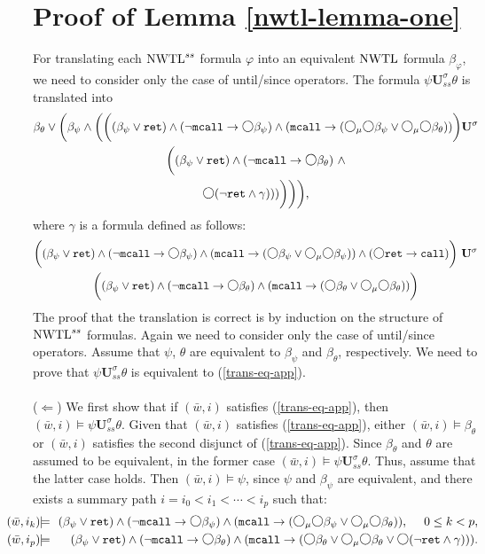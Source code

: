 \documentclass{LMCS}
\newcommand{\M}{{\mu}}
\newcommand{\w}{{\bar{w}}}
\newcommand{\dm}{\Diamond}
\newcommand{\U}{{\mathbf U}}
\newcommand{\next}{\text{\raisebox{1pt}{$\bigcirc$}}}
\renewcommand{\phi}{\varphi}
\theoremstyle{plain}
\theoremstyle{definition}
\newcommand{\ppath}{\sigma} \newcommand{\Ul}{\U}
\newcommand{\Up}{\U^\ppath}
\newcommand{\Uss}{\Up_{ss}}
\newcommand{\mcall}{{\tt{mcall}}}
\newcommand{\nwtlss}{\nwtl^{ss}}
\newcommand{\rett}{{\tt ret}}
\newcommand{\call}{{\tt call}}
\newcommand{\dmm}{\dm_{\M}}
\renewcommand{\dm}{\next}
\renewcommand{\dmm}{\dm_\M}
\begin{document}
\section{Proof of Lemma \ref{nwtl-lemma-one}}
\noindent
For translating each $\nwtlss$ formula $\phi$ into an equivalent
$\text{\rm NWTL}$ formula $\beta_\phi$, we need to consider only the case of
until/since operators. The formula $\psi \Uss \theta$ is translated
into
{\small
\begin{multline}
\label{trans-eq-app}
{\beta_\theta \vee \bigg(\beta_\psi \wedge \bigg(\bigg((\beta_\psi \vee
\rett) \wedge (\neg \mcall \to \dm \beta_\psi) \wedge (\mcall \to (\dmm
\dm \beta_\psi \vee \dmm \dm \beta_\theta))\bigg) \Up} \\ 
{\bigg((\beta_\psi \vee \rett) \wedge (\neg \mcall \to \dm \beta_\theta)
\ \wedge} \\ 
{\dm (\neg \rett \wedge \gamma)))\bigg)\bigg)\bigg),}
\end{multline}
}
where $\gamma$ is a formula defined as follows:
{\small
\begin{multline*}
{\bigg((\beta_\psi \vee
\rett) \wedge (\neg \mcall \to \dm \beta_\psi) \wedge (\mcall \to (\dm
\beta_\psi \vee \dmm \dm \beta_\psi)) \wedge (\dm \rett \to
\call) \bigg)\ \Up}\\ 
{\bigg((\beta_\psi \vee \rett) \wedge (\neg\mcall \to \dm \beta_\theta)
\wedge (\mcall \to (\dm \beta_\theta \vee \dmm  \dm  \beta_\theta))\bigg)}
\end{multline*}
}
The proof that the translation is correct is by induction on the
structure of $\nwtlss$ formulas. Again we need to consider only the
case of until/since operators. Assume that $\psi$, $\theta$ are
equivalent to $\beta_\psi$ and $\beta_\theta$, respectively. We need
to prove that $\psi \Uss \theta$ is equivalent to (\ref{trans-eq-app}).
\\
\\
($\Leftarrow$) We first show that if 
$(\w, i)$ satisfies (\ref{trans-eq-app}), then $(\w, i) \models \psi \Uss
\theta$. Given that $(\w, i)$
satisfies (\ref{trans-eq-app}), either $(\w, i) \models \beta_\theta$ or
$(\w, i)$ satisfies the second disjunct of
(\ref{trans-eq-app}). Since $\beta_\theta$ and $\theta$ are assumed to be
equivalent, in the former case $(\w, i) \models \psi \Uss
\theta$. Thus, assume that the latter case holds. Then $(\w, i)
\models \psi$, since $\psi$ and $\beta_\psi$ are equivalent, and there
exists a summary path $i = i_0 < i_1 < \cdots < i_p$ such that:
{\small
\begin{eqnarray}
\hspace{-8mm}(\w, i_k) & \!\!\models\!\! & (\beta_\psi \vee \rett)
\wedge (\neg \mcall \to \dm \beta_\psi) \wedge (\mcall \to (\dmm \dm
\beta_\psi \vee \dmm  \dm \beta_\theta)), \ \ \ \ 0 \leq k < p,
\label{gamma-eq-one}\\    
\hspace{-8mm}(\w, i_p) & \!\!\models\!\! & (\beta_\psi \vee \rett)
\wedge (\neg \mcall \to \dm \beta_\theta) \wedge (\mcall \to (\dm
\beta_\theta \vee \dmm \dm \beta_\theta \vee \dm (\neg \rett \wedge
\gamma))). \label{gamma-eq-two}  
\end{eqnarray}}\noindent
\end{document}
